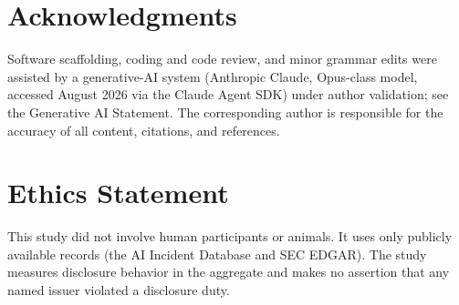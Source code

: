\documentclass[utf8]{FrontiersinHarvard}
\begin{document}
\section*{Acknowledgments}
Software scaffolding, coding and code review, and minor grammar edits were assisted by a generative-AI system (Anthropic Claude, Opus-class model, accessed August 2026 via the Claude Agent SDK) under author validation; see the Generative AI Statement. The corresponding author is responsible for the accuracy of all content, citations, and references.

\section*{Ethics Statement}
This study did not involve human participants or animals. It uses only publicly available records (the AI Incident Database and SEC EDGAR). The study measures disclosure behavior in the aggregate and makes no assertion that any named issuer violated a disclosure duty.
\end{document}
